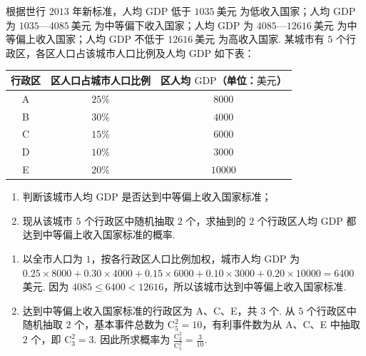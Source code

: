 \begin{problem}
根据世行 \(2013\) 年新标准，人均 \(\mathrm{GDP}\) 低于 \(1035\ \text{美元}\) 为低收入国家；人均 \(\mathrm{GDP}\) 为 \(1035\text{—}4085\ \text{美元}\) 为中等偏下收入国家；人均 \(\mathrm{GDP}\) 为 \(4085\text{—}12616\ \text{美元}\) 为中等偏上收入国家；人均 \(\mathrm{GDP}\) 不低于 \(12616\ \text{美元}\) 为高收入国家. 某城市有 \(5\) 个行政区，各区人口占该城市人口比例及人均 \(\mathrm{GDP}\) 如下表：

\begin{center}
\begin{tabular}{|c|c|c|}
\hline
行政区 & 区人口占城市人口比例 & 区人均 \(\mathrm{GDP}\)（单位：\(\text{美元}\)） \\
\hline
A & \(25\%\) & \(8000\) \\
\hline
B & \(30\%\) & \(4000\) \\
\hline
C & \(15\%\) & \(6000\) \\
\hline
D & \(10\%\) & \(3000\) \\
\hline
E & \(20\%\) & \(10000\) \\
\hline
\end{tabular}
\end{center}

\begin{enumerate}
\item 判断该城市人均 \(\mathrm{GDP}\) 是否达到中等偏上收入国家标准；
\item 现从该城市 \(5\) 个行政区中随机抽取 \(2\) 个，求抽到的 \(2\) 个行政区人均 \(\mathrm{GDP}\) 都达到中等偏上收入国家标准的概率.
\end{enumerate}

\begin{solution}
\begin{enumerate}
\item 以全市人口为 \(1\)，按各行政区人口比例加权，城市人均 \(\mathrm{GDP}\) 为 \(0.25\times8000+0.30\times4000+0.15\times6000+0.10\times3000+0.20\times10000=6400\) 美元. 因为 \(4085\leqslant6400<12616\)，所以该城市达到中等偏上收入国家标准.
\item 达到中等偏上收入国家标准的行政区为 A、C、E，共 \(3\) 个. 从 \(5\) 个行政区中随机抽取 \(2\) 个，基本事件总数为 \(\mathrm C_5^2=10\)，有利事件数为从 A、C、E 中抽取 \(2\) 个，即 \(\mathrm C_3^2=3\). 因此所求概率为 \(\frac{\mathrm C_3^2}{\mathrm C_5^2}=\frac3{10}\).
\end{enumerate}
\end{solution}
\end{problem}


